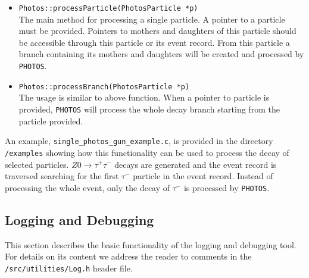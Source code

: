 \documentclass[]{Photos_interface_design}
\begin{document}
\begin{itemize}
  \item {\tt Photos::processParticle(PhotosParticle *p) } \hfill \\
		The main method for processing a single particle. A pointer to a particle must
		be provided. Pointers to mothers and daughters of this particle should be
		accessible through this particle or its event record.
		From this particle a branch containing its mothers and daughters
		will be created and processed by {\tt PHOTOS}.
  \item {\tt Photos::processBranch(PhotosParticle *p) } \hfill \\
		The usage is similar to above function. When a pointer to particle is provided,
		{\tt PHOTOS} will process the whole decay branch starting from the particle provided.
\end{itemize}

An example, {\tt single\_photos\_gun\_example.c}, is provided in the directory {\tt /examples}
showing how this functionality can be used to process the decay of selected particles.
$Z0 \rightarrow \tau^+ \tau^-$ decays are generated and the event record is traversed
searching for the first $\tau^-$ particle in the event record.
Instead of processing the whole event, only the decay of $\tau^-$ is processed by {\tt PHOTOS}.


\subsection{Logging and Debugging}
\label{App:Logging}
This section describes the basic functionality of the logging and debugging tool.
For details on its content we address the reader to comments in the {\tt /src/utilities/Log.h} header file.
\end{document}
